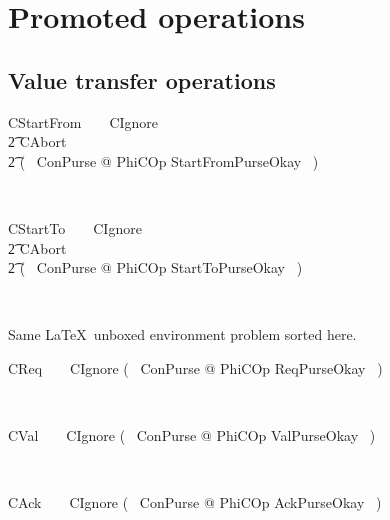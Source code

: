 \section{Promoted operations}

\subsection{Value transfer operations}

\begin{LSDef}
\begin{zed}
  CStartFrom~~~~CIgnore
  \\ \t2          \lor CAbort
  \\ \t2          \lor (~ \exists \Delta ConPurse @
  PhiCOp \land StartFromPurseOkay ~)
\end{zed}~\end{LSDef}

\begin{LSDef}
\begin{zed}
  CStartTo~~~~CIgnore
  \\ \t2          \lor CAbort
  \\ \t2          \lor (~ \exists \Delta ConPurse @
  PhiCOp \land StartToPurseOkay ~)
\end{zed}~\end{LSDef}

Same \LaTeX\ unboxed environment problem sorted here.
%
\begin{LSDef}
\begin{zed}
  CReq~~~~CIgnore \lor (~ \exists \Delta ConPurse @
  PhiCOp \land ReqPurseOkay ~)
\end{zed}~\end{LSDef}

\begin{LSDef}
\begin{zed}
  CVal~~~~CIgnore \lor (~ \exists \Delta ConPurse  @
  PhiCOp \land ValPurseOkay ~)
\end{zed}~\end{LSDef}

\begin{LSDef}
\begin{zed}
  CAck~~~~CIgnore \lor (~ \exists \Delta ConPurse @
  PhiCOp \land AckPurseOkay ~)
\end{zed}~\end{LSDef}

